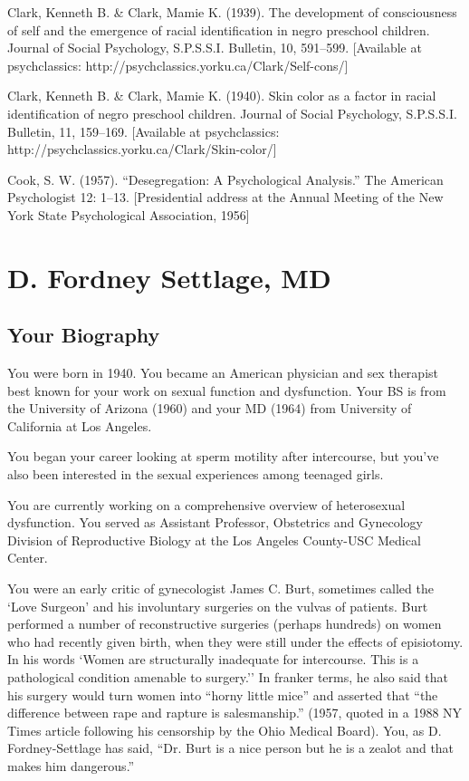 \begin{refsection}
Clark, Kenneth B. \& Clark, Mamie K. (1939). The development of consciousness of self and the emergence of racial identification in negro preschool children. Journal of Social Psychology, S.P.S.S.I. Bulletin, 10, 591--599. [Available at psychclassics: http:\slash \slash psychclassics.yorku.ca\slash Clark\slash Self-cons\slash ]

Clark, Kenneth B. \& Clark, Mamie K. (1940). Skin color as a factor in racial identification of negro preschool children. Journal of Social Psychology, S.P.S.S.I. Bulletin, 11, 159--169. [Available at psychclassics: http:\slash \slash psychclassics.yorku.ca\slash Clark\slash Skin-color\slash ]

Cook, S. W. (1957). ``Desegregation: A Psychological Analysis.'' The American Psychologist 12: 1--13. [Presidential address at the Annual Meeting of the New York State Psychological Association, 1956]

\chapter{D. Fordney Settlage, MD}
\label{d.fordneysettlagemd}

\section{Your Biography}
\label{yourbiography}

You were born in 1940. You became an American physician and sex therapist best known for your work on sexual function and dysfunction. Your BS is from the University of Arizona (1960) and your MD (1964) from University of California at Los Angeles.

You began your career looking at sperm motility after intercourse, but you've also been interested in the sexual experiences among teenaged girls.

You are currently working on a comprehensive overview of heterosexual dysfunction. You served as Assistant Professor, Obstetrics and Gynecology Division of Reproductive Biology at the Los Angeles County-USC Medical Center.

You were an early critic of gynecologist James C. Burt, sometimes called the `Love Surgeon' and his involuntary surgeries on the vulvas of patients. Burt performed a number of reconstructive surgeries (perhaps hundreds) on women who had recently given birth, when they were still under the effects of episiotomy. In his words `Women are structurally inadequate for intercourse. This is a pathological condition amenable to surgery.'' In franker terms, he also said that his surgery would turn women into ``horny little mice'' and asserted that ``the difference between rape and rapture is salesmanship.'' (1957, quoted in a 1988 NY Times article following his censorship by the Ohio Medical Board). You, as D. Fordney-Settlage has said, ``Dr. Burt is a nice person but he is a zealot and that makes him dangerous.''


\end{refsection}
